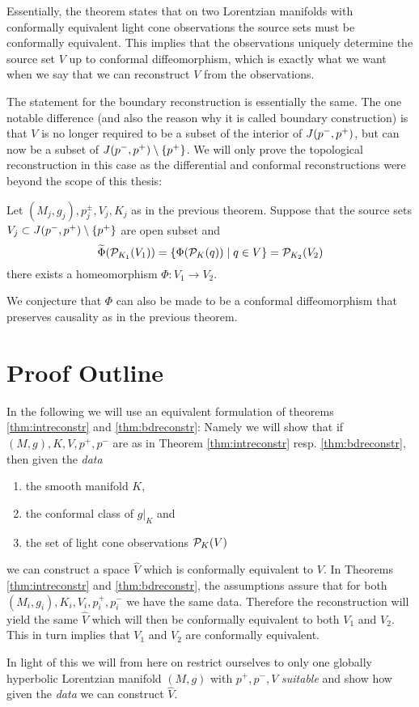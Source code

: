 Essentially, the theorem states that on two Lorentzian manifolds with conformally equivalent light cone observations the source sets must be conformally equivalent. This implies that the observations uniquely determine the source set $V$ up to conformal diffeomorphism, which is exactly what we want when we say that we can reconstruct $V$ from the observations. 

The statement for the boundary reconstruction is essentially the same. The one notable difference (and also the reason why it is called boundary construction) is that $V$ is no longer required to be a subset of the interior of $J(p^-,p^+)$, but can now be a subset of $J(p^-,p^+) \setminus \{p^+\}$. We will only prove the topological reconstruction in this case as the differential and conformal reconstructions were beyond the scope of this thesis:
\begin{theorem}\label{thm:bdreconstr}
    Let $(M_j,g_j), p^\pm_j, V_j, K_j$ as in the previous theorem.
    Suppose that the source sets $V_j\subset J(p^-,p^+)\setminus\{p^+\}$ are open subset and
    \[
    \widetilde{\Phi}({\mathcal{P}}_{K_1}(V_1)) = \{\Phi({\mathcal{P}}_K(q))\mid q \in V\} = {\mathcal{P}}_{K_2}(V_2)
    \]
    there exists a homeomorphism $\Phi:V_1\to V_2$.
\end{theorem}
We conjecture that $\Phi$ can also be made to be a conformal diffeomorphism that preserves causality as in the previous theorem.

\section{Proof Outline}
\begin{remark}[Data]\label{rmk:data} 
    In the following we will use an equivalent formulation of theorems \ref{thm:intreconstr} and \ref{thm:bdreconstr}: Namely we will show that if $(M,g), K, V, p^+,p^-$ are as in Theorem \ref{thm:intreconstr} resp. \ref{thm:bdreconstr}, then given the \emph{data}
    \begin{enumerate}[label={\textnormal{(\arabic*)}}]
        \item the smooth manifold $K$,
        \item the conformal class of $g\rvert_K$ and
        \item the set of light cone observations ${\mathcal{P}}_K(V)$
    \end{enumerate}
    we can construct a space $\widehat{V}$ which is conformally equivalent to $V$.
    In Theorems \ref{thm:intreconstr} and \ref{thm:bdreconstr}, the assumptions assure that for both $(M_i,g_i), K_i, V_i, p^+_i,p^-_i$ we have the same data. Therefore the reconstruction will yield the same $\widehat{V}$ which will then be conformally equivalent to both $V_1$ and $V_2$. This in turn implies that $V_1$ and $V_2$ are conformally equivalent.

    In light of this we will from here on restrict ourselves to only one globally hyperbolic Lorentzian manifold $(M,g)$ with $p^+,p^-, V$ \emph{suitable} and show how given the \emph{data} we can construct $\widehat{V}$.
\end{remark}

